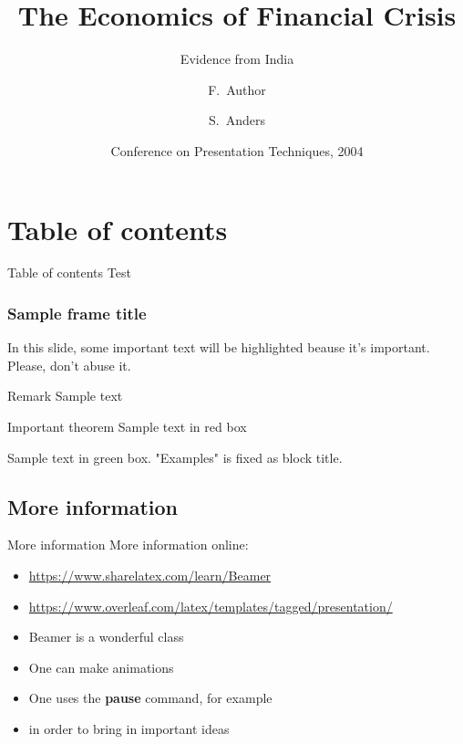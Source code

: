 \documentclass[10pt, a4paper]{beamer} %
\title[Crisis] %
{The Economics of Financial Crisis}
\subtitle{Evidence from India}
\author[Author, Anders] %
{F.~Author\inst{1} \and S.~Anders\inst{2}}
\institute[Universities Here and There] %
{
  \inst{1}%
  Institute of Computer Science\\
  University Here
  \and
  \inst{2}%
  Institute of Theoretical Philosophy\\
  University There
}
\date[KPT 2004] %
{Conference on Presentation Techniques, 2004}
\begin{document}
\begin{frame}
\titlepage
\end{frame}


\section{Table of contents}
\begin{frame}{Table of contents}
Test
\end{frame}

\begin{frame}
\frametitle{Sample frame title}
 
In this slide, some important text will be
\alert{highlighted} beause it's important.
Please, don't abuse it.
 
\begin{block}{Remark}
Sample text
\end{block}
 
\begin{alertblock}{Important theorem}
Sample text in red box
\end{alertblock}
 
\begin{examples}
Sample text in green box. "Examples" is fixed as block title.
\end{examples}
\end{frame}

\subsection{More information}
\begin{frame}{More information}
More information online: 
\begin{itemize}
\item \url{https://www.sharelatex.com/learn/Beamer}
\item \url{https://www.overleaf.com/latex/templates/tagged/presentation/}
\end{itemize}
\end{frame}

\begin{frame}

\begin{itemize}
\item Beamer is a wonderful class
\pause \item One can make animations
\pause \item One uses the \textbf{pause} command, for example
\pause \item in order to bring in important ideas
\end{itemize}

\end{frame}
\end{document}
